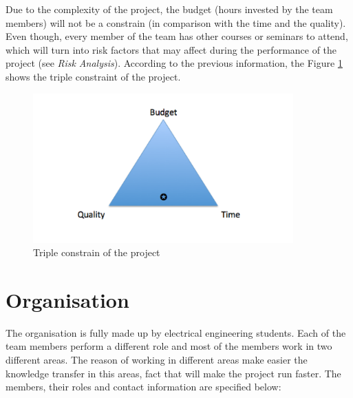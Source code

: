 \documentclass[11pt]{article}
\begin{document}
Due to the complexity of the project, the budget (hours invested by the team members) will not be a constrain (in comparison with the time and the quality). Even though, every member of the team has other courses or seminars to attend, which will turn into risk factors that may affect during the performance of the project (see \textit{Risk Analysis}). According to the previous information, the Figure \ref{3_const} shows the triple constraint of the project.

		\begin{figure}[h]
		\centering
		\includegraphics[width=10cm]{tripleconstrain}
		\caption{Triple constrain of the project}
		\label{3_const}
		\end{figure}

\section{Organisation}

The organisation is fully made up by electrical engineering students. Each of the team members perform a different role and most of the members work in two different areas. The reason of working in different areas make easier the knowledge transfer in this areas, fact that will make the project run faster. The members, their roles and contact information are specified below:
\end{document}
